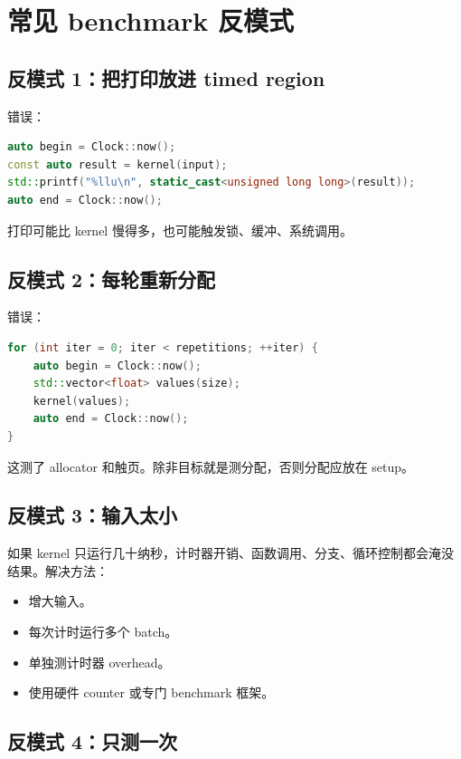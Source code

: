 \section{常见 benchmark 反模式}

\subsection{反模式 1：把打印放进 timed region}

错误：

\begin{lstlisting}[language=C++]
auto begin = Clock::now();
const auto result = kernel(input);
std::printf("%llu\n", static_cast<unsigned long long>(result));
auto end = Clock::now();
\end{lstlisting}

打印可能比 kernel 慢得多，也可能触发锁、缓冲、系统调用。

\subsection{反模式 2：每轮重新分配}

错误：

\begin{lstlisting}[language=C++]
for (int iter = 0; iter < repetitions; ++iter) {
    auto begin = Clock::now();
    std::vector<float> values(size);
    kernel(values);
    auto end = Clock::now();
}
\end{lstlisting}

这测了 allocator 和触页。除非目标就是测分配，否则分配应放在 setup。

\subsection{反模式 3：输入太小}

如果 kernel 只运行几十纳秒，计时器开销、函数调用、分支、循环控制都会淹没结果。解决方法：

\begin{itemize}
  \item 增大输入。
  \item 每次计时运行多个 batch。
  \item 单独测计时器 overhead。
  \item 使用硬件 counter 或专门 benchmark 框架。
\end{itemize}

\subsection{反模式 4：只测一次}

